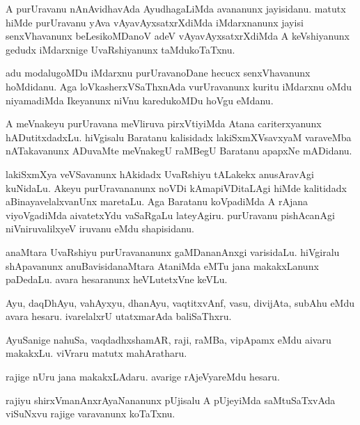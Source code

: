 \documentclass{article}
\begin{document}
\begin{mn}%
A purUravanu nAnAvidhavAda AyudhagaLiMda avananunx jayisidanu. matutx
hiMde purUravanu yAva vAyavAyxsatxrXdiMda iMdarxnanunx jayisi
senxVhavanunx beLesikoMDanoV adeV vAyavAyxsatxrXdiMda A keVshiyanunx
gedudx iMdarxnige UvaRshiyanunx taMdukoTaTxnu.
\end{mn}

\begin{mn}
adu modalugoMDu iMdarxnu purUravanoDane hecucx senxVhavanunx
hoMdidanu. Aga loVkasherxVSaThxnAda vurUravanunx kuritu iMdarxnu oMdu
niyamadiMda Ikeyanunx niVnu karedukoMDu hoVgu eMdanu.
\end{mn}

\begin{mn}%
A meVnakeyu purUravana meVliruva pirxVtiyiMda Atana cariterxyanunx
hADutitxdadxLu. hiVgisalu Baratanu kalisidadx lakiSxmXVsavxyaM
varaveMba nATakavanunx ADuvaMte meVnakegU raMBegU Baratanu apapxNe mADidanu.
\end{mn}

\begin{mn}
lakiSxmXya veVSavanunx hAkidadx UvaRshiyu tALakekx anusAravAgi
kuNidaLu. Akeyu purUravananunx noVDi kAmapiVDitaLAgi hiMde kalitidadx
aBinayavelalxvanUnx maretaLu. Aga Baratanu koVpadiMda  A rAjana
viyoVgadiMda aivatetxYdu vaSaRgaLu lateyAgiru. purUravanu pishAcanAgi
niVniruvalilxyeV iruvanu eMdu shapisidanu.
\end{mn}

\begin{mn}
anaMtara UvaRshiyu purUravananunx gaMDananAnxgi varisidaLu. hiVgiralu
shApavanunx anuBavisidanaMtara AtaniMda eMTu jana makakxLanunx
paDedaLu. avara hesaranunx heVLutetxVne keVLu.
\end{mn}

\begin{mn}
Ayu, daqDhAyu, vahAyxyu, dhanAyu, vaqtitxvAnf, vasu, divijAta, subAhu
eMdu avara hesaru. ivarelalxrU utatxmarAda baliSaThxru.
\end{mn}

\begin{mn}
AyuSanige nahuSa, vaqdadhxshamAR, raji, raMBa, vipApamx eMdu aivaru
makakxLu. viVraru matutx mahAratharu.
\end{mn}

\begin{mn}
rajige nUru jana makakxLAdaru. avarige rAjeVyareMdu hesaru.
\end{mn}

\begin{mn}%
rajiyu shirxVmanAnxrAyaNananunx pUjisalu A pUjeyiMda saMtuSaTxvAda
viSuNxvu rajige varavanunx koTaTxnu.
\end{mn}
\end{document}
